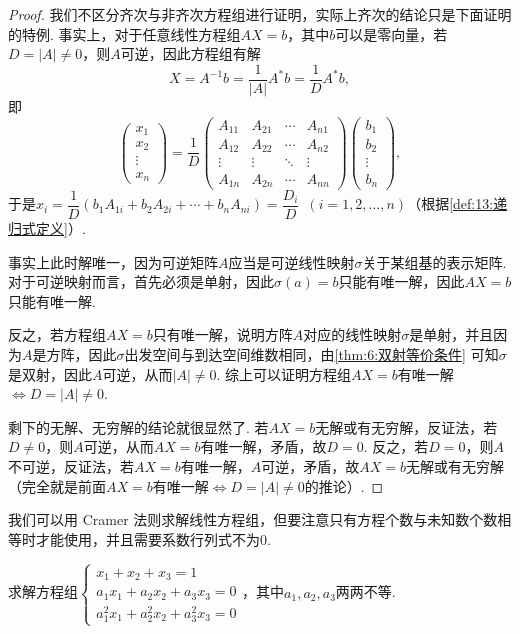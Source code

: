 \begin{proof}
    我们不区分齐次与非齐次方程组进行证明，实际上齐次的结论只是下面证明的特例. 事实上，对于任意线性方程组$AX=b$，其中$b$可以是零向量，若$D=|A|\neq 0$，则$A$可逆，因此方程组有解
    \[X=A^{-1}b=\frac{1}{|A|}A^*b=\frac{1}{D}A^*b,\]
    即
    \[\begin{pmatrix}
            x_1 \\ x_2 \\ \vdots \\ x_n
        \end{pmatrix}= \dfrac{1}{D}\begin{pmatrix}
            A_{11} & A_{21} & \cdots & A_{n1} \\
            A_{12} & A_{22} & \cdots & A_{n2} \\
            \vdots & \vdots & \ddots & \vdots \\
            A_{1n} & A_{2n} & \cdots & A_{nn}
        \end{pmatrix}\begin{pmatrix}
            b_1 \\ b_2 \\ \vdots \\ b_n
        \end{pmatrix},\]
    于是$x_i=\dfrac{1}{D}(b_1A_{1i}+b_2A_{2i}+\cdots+b_nA_{ni})=\dfrac{D_i}{D}\enspace(i=1,2,\ldots,n)$（根据\autoref{def:13:递归式定义}）.

    事实上此时解唯一，因为可逆矩阵$A$应当是可逆线性映射$\sigma$关于某组基的表示矩阵. 对于可逆映射而言，首先必须是单射，因此$\sigma(a)=b$只能有唯一解，因此$AX=b$只能有唯一解.

    反之，若方程组$AX=b$只有唯一解，说明方阵$A$对应的线性映射$\sigma$是单射，并且因为$A$是方阵，因此$\sigma$出发空间与到达空间维数相同，由\autoref{thm:6:双射等价条件} 可知$\sigma$是双射，因此$A$可逆，从而$|A|\neq 0$. 综上可以证明方程组$AX=b$有唯一解$\iff D=|A|\neq 0$.

    剩下的无解、无穷解的结论就很显然了. 若$AX=b$无解或有无穷解，反证法，若$D\neq 0$，则$A$可逆，从而$AX=b$有唯一解，矛盾，故$D=0$. 反之，若$D=0$，则$A$不可逆，反证法，若$AX=b$有唯一解，$A$可逆，矛盾，故$AX=b$无解或有无穷解（完全就是前面$AX=b$有唯一解$\iff D=|A|\neq 0$的推论）.
\end{proof}

我们可以用 Cramer 法则求解线性方程组，但要注意只有方程个数与未知数个数相等时才能使用，并且需要系数行列式不为0.
\begin{example}
    求解方程组$\begin{cases}
            x_1+x_2+x_3=1          \\
            a_1x_1+a_2x_2+a_3x_3=0 \\
            a_1^2x_1+a_2^2x_2+a_3^2x_3=0
        \end{cases}$，其中$a_1,a_2,a_3$两两不等.
\end{example}

